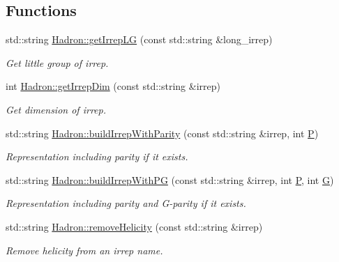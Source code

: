 \subsection*{Functions}
\begin{DoxyCompactItemize}
\item 
std\+::string \mbox{\hyperlink{namespaceHadron_a79373fb0ae210931217ae33dc98f5ee9}{Hadron\+::get\+Irrep\+LG}} (const std\+::string \&long\+\_\+irrep)
\begin{DoxyCompactList}\small\item\em Get little group of irrep. \end{DoxyCompactList}\item 
int \mbox{\hyperlink{namespaceHadron_a0451202d2f27c90c438c0d23da609c62}{Hadron\+::get\+Irrep\+Dim}} (const std\+::string \&irrep)
\begin{DoxyCompactList}\small\item\em Get dimension of irrep. \end{DoxyCompactList}\item 
std\+::string \mbox{\hyperlink{namespaceHadron_a036614bb88af01a4308fe463a99f5b12}{Hadron\+::build\+Irrep\+With\+Parity}} (const std\+::string \&irrep, int \mbox{\hyperlink{adat__devel_2lib_2hadron_2operator__name__util_8cc_aef94be98e2c9e4a4dece75f60ca9792c}{P}})
\begin{DoxyCompactList}\small\item\em Representation including parity if it exists. \end{DoxyCompactList}\item 
std\+::string \mbox{\hyperlink{namespaceHadron_a45b2852ba4456b8729474ced77a3615f}{Hadron\+::build\+Irrep\+With\+PG}} (const std\+::string \&irrep, int \mbox{\hyperlink{adat__devel_2lib_2hadron_2operator__name__util_8cc_aef94be98e2c9e4a4dece75f60ca9792c}{P}}, int \mbox{\hyperlink{adat__devel_2lib_2hadron_2operator__name__util_8cc_ab8735735273b982cc3125e51fe46e2f4}{G}})
\begin{DoxyCompactList}\small\item\em Representation including parity and G-\/parity if it exists. \end{DoxyCompactList}\item 
std\+::string \mbox{\hyperlink{namespaceHadron_a877ae1e797f5cf4d4ebb7e22d5bbe69b}{Hadron\+::remove\+Helicity}} (const std\+::string \&irrep)
\begin{DoxyCompactList}\small\item\em Remove helicity from an irrep name. \end{DoxyCompactList}\item 

\end{DoxyCompactItemize}
